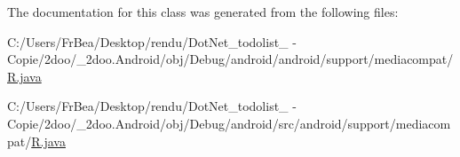 The documentation for this class was generated from the following files:\begin{CompactItemize}
\item 
C:/Users/FrBea/Desktop/rendu/DotNet\_\-todolist\_ - Copie/2doo/\_\-2doo.Android/obj/Debug/android/android/support/mediacompat/\hyperlink{android_2support_2mediacompat_2_r_8java}{R.java}\item 
C:/Users/FrBea/Desktop/rendu/DotNet\_\-todolist\_ - Copie/2doo/\_\-2doo.Android/obj/Debug/android/src/android/support/mediacompat/\hyperlink{src_2android_2support_2mediacompat_2_r_8java}{R.java}\end{CompactItemize}
